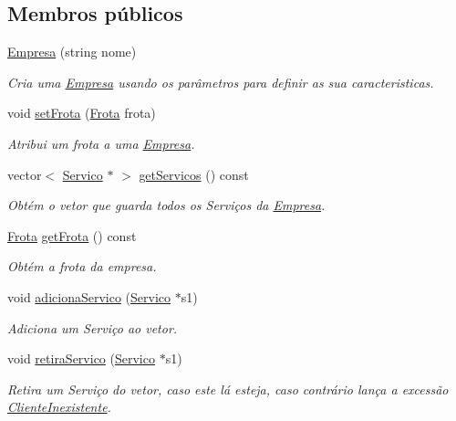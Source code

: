 \subsection*{Membros públicos}
\begin{DoxyCompactItemize}
\item 
\hyperlink{class_empresa_ac5bccaf3758b25fea4803a63d4362236}{Empresa} (string nome)
\begin{DoxyCompactList}\small\item\em Cria uma \hyperlink{class_empresa}{Empresa} usando os parâmetros para definir as sua caracteristicas. \end{DoxyCompactList}\item 
void \hyperlink{class_empresa_a30c9127acfb46b0617749fd9c3151b22}{set\+Frota} (\hyperlink{class_frota}{Frota} frota)
\begin{DoxyCompactList}\small\item\em Atribui um frota a uma \hyperlink{class_empresa}{Empresa}. \end{DoxyCompactList}\item 
vector$<$ \hyperlink{class_servico}{Servico} $\ast$ $>$ \hyperlink{class_empresa_a5b64141cd1395ed4ba4b12822986ec98}{get\+Servicos} () const 
\begin{DoxyCompactList}\small\item\em Obtém o vetor que guarda todos os Serviços da \hyperlink{class_empresa}{Empresa}. \end{DoxyCompactList}\item 
\hyperlink{class_frota}{Frota} \hyperlink{class_empresa_afd239717a3e8e57b28e722df306941ce}{get\+Frota} () const 
\begin{DoxyCompactList}\small\item\em Obtém a frota da empresa. \end{DoxyCompactList}\item 
void \hyperlink{class_empresa_a3e6883a21a837c02cdaae73b401b75d7}{adiciona\+Servico} (\hyperlink{class_servico}{Servico} $\ast$s1)
\begin{DoxyCompactList}\small\item\em Adiciona um Serviço ao vetor. \end{DoxyCompactList}\item 
void \hyperlink{class_empresa_a17e3b2a202233623f8c9dc183b65364e}{retira\+Servico} (\hyperlink{class_servico}{Servico} $\ast$s1)
\begin{DoxyCompactList}\small\item\em Retira um Serviço do vetor, caso este lá esteja, caso contrário lança a excessão \hyperlink{class_cliente_inexistente}{Cliente\+Inexistente}. \end{DoxyCompactList}\item 

\end{DoxyCompactItemize}
